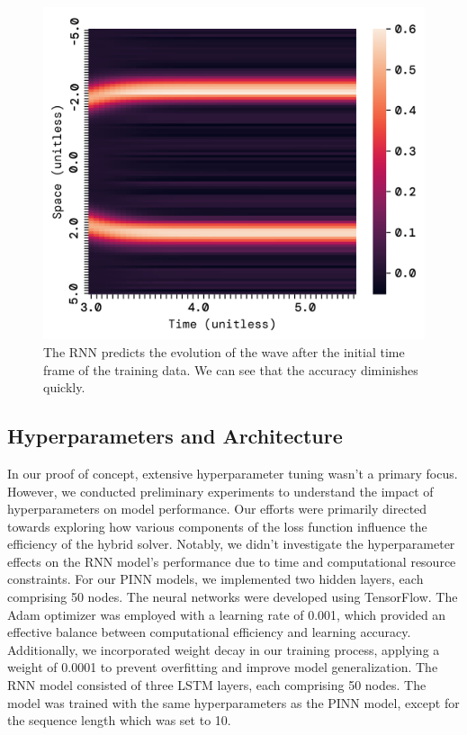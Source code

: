 \documentclass[twoside,11pt]{report}
\begin{document}
\begin{figure}[!ht]
\begin{minipage}[t]{0.5\textwidth - 1mm}
\begin{center}
                \includegraphics[width=\textwidth]{../runsAndFigures/wave_rnn_future.png}
            \end{center}
            \caption
            {
                The RNN predicts the evolution of the wave after the initial time frame of the training data.
                We can see that the accuracy diminishes quickly.
            }\label{fig:wave_tf_dnn}
        \end{minipage}
    \end{figure}





\subsection{Hyperparameters and Architecture}
\label{sec:hyperparameters}

    In our proof of concept, extensive hyperparameter tuning wasn't a primary focus. 
    However, we conducted preliminary experiments to understand the impact of hyperparameters 
    on model performance. Our efforts were primarily directed towards exploring how various 
    components of the loss function influence the efficiency of the hybrid solver. Notably, 
    we didn't investigate the hyperparameter effects on the RNN model's performance due to time 
    and computational resource constraints.
    For our PINN models, we implemented two hidden layers, each comprising 50 nodes. The neural 
    networks were developed using TensorFlow\cite{tensorflow2015-whitepaper}. The Adam optimizer was 
    employed with a learning 
    rate of 0.001, which provided an effective balance between computational efficiency and learning accuracy. 
    Additionally, we incorporated weight decay in our training process, applying a weight of 0.0001 to prevent 
    overfitting and improve model generalization.
    The RNN model consisted of three LSTM layers, each comprising 50 nodes. The model was trained
    with the same hyperparameters as the PINN model, except for the sequence length which was set to 10.
\end{document}
